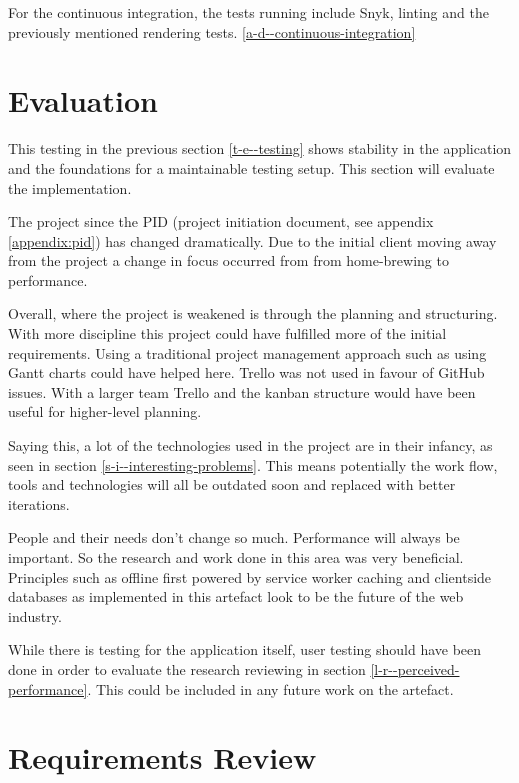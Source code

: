 For the continuous integration, the tests running include Snyk, linting and the previously mentioned rendering tests. \ref{a-d--continuous-integration}

\section{Evaluation} \label{t-e--evaluation}

This testing in the previous section \ref{t-e--testing} shows stability in the application and the foundations for a maintainable testing setup. This section will evaluate the implementation.

The project since the PID (project initiation document, see appendix \ref{appendix:pid}) has changed dramatically. Due to the initial client moving away from the project a change in focus occurred from from home-brewing to performance. %

Overall, where the project is weakened is through the planning and structuring. With more discipline this project could have fulfilled more of the initial requirements. Using a traditional project management approach such as using Gantt charts could have helped here. Trello was not used in favour of GitHub issues. With a larger team Trello and the kanban structure would have been useful for higher-level planning.

Saying this, a lot of the technologies used in the project are in their infancy, as seen in section \ref{s-i--interesting-problems}. This means potentially the work flow, tools and technologies will all be outdated soon and replaced with better iterations.

People and their needs don't change so much. Performance will always be important. So the research and work done in this area was very beneficial. Principles such as offline first powered by service worker caching and clientside databases as implemented in this artefact look to be the future of the web industry.

While there is testing for the application itself, user testing should have been done in order to evaluate the research reviewing in section \ref{l-r--perceived-performance}. This could be included in any future work on the artefact.

\section{Requirements Review} \label{t-e--requirements-review}

